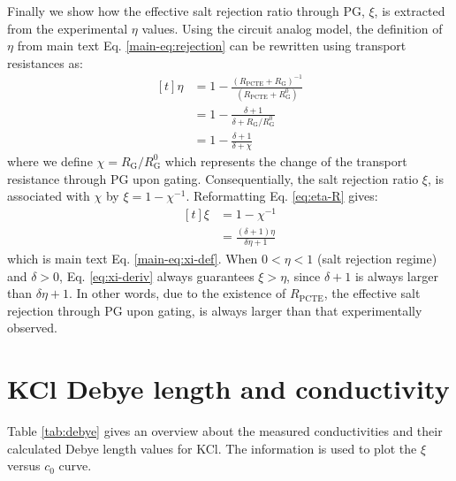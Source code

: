 \documentclass[manuscript=suppinfo,email=true, hyperref=true, keywords=false]{achemso}
\begin{document}
Finally we show how the effective salt rejection ratio through PG, $\xi$,
is extracted from the experimental $\eta$ values. Using the circuit
analog model, the definition of $\eta$ from main text
Eq. \ref{main-eq:rejection} can be rewritten using transport
resistances as:
\begin{equation}
  \begin{aligned}[t]
      \label{eq:eta-R}
  \eta &= 1 - {\displaystyle
    \frac{(R_{\mathrm{PCTE}} + R_{\mathrm{G}})^{-1}}
    {(R_{\mathrm{PCTE}} + R_{\mathrm{G}}^{0})}} \\
    &= 1 - \frac{\delta + 1}{\delta + R_{\mathrm{G}}/R_{\mathrm{G}}^{0}} \\
    &= 1 - \frac{\delta + 1}{\delta + \chi}
  \end{aligned}
\end{equation}
where we define $\chi = R_{\mathrm{G}}/R_{\mathrm{G}}^{0}$ which
represents the change of the transport resistance through PG upon
gating. Consequentially, the salt rejection ratio $\xi$, is associated
with $\chi$ by $\xi = 1 - \chi^{-1}$. Reformatting Eq. \ref{eq:eta-R}
gives:
\begin{equation}
  \label{eq:xi-deriv}
  \begin{aligned}[t]
    \xi &= 1 - \chi^{-1} \\
    &= \frac{(\delta + 1) \eta}{\delta\eta + 1}
  \end{aligned}
\end{equation}
which is main text Eq. \ref{main-eq:xi-def}. When $0<\eta<1$ (salt
rejection regime) and $\delta>0$, Eq. \ref{eq:xi-deriv} always
guarantees $\xi>\eta$, since $\delta + 1$ is always larger than
$\delta\eta + 1$. In other words, due to the existence of
$R_{\mathrm{PCTE}}$, the effective salt rejection through PG upon
gating, is always larger than that experimentally observed.

\section{KCl Debye length and conductivity}
\label{sec:debye}
Table \ref{tab:debye} gives an overview about the measured
conductivities and their calculated Debye length values for KCl. The
information is used to plot the $\xi$ versus $c_{0}$ curve.
\end{document}
